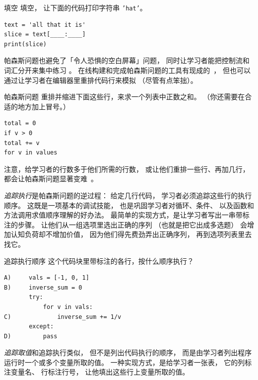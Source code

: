 \begin{aside}{填空}
  填空，
  让下面的代码打印字符串 \texttt{'hat'}。

\begin{verbatim}
text = 'all that it is'
slice = text[____:____]
print(slice)
\end{verbatim}
\end{aside}

帕森斯问题也避免了「令人恐惧的空白屏幕」问题，
同时让学习者能把控制流和词汇分开来集中练习
\cite{Pars2006,Eric2015,Morr2016,Eric2017}。
在线构建和完成帕森斯问题的工具有现成的~\cite{Ihan2011}，
但也可以通过让学习者在编辑器里重排代码行来模拟
（尽管有点笨拙）。

\begin{aside}{帕森斯问题}
  重排并缩进下面这些行，来求一个列表中正数之和。
  （你还需要在合适的地方加上冒号。）

\begin{verbatim}
total = 0
if v > 0
total += v
for v in values
\end{verbatim}
\end{aside}

注意，给学习者的行数多于他们所需的行数，
或让他们重排一些行、再加几行，
都会让帕森斯问题显著变难~\cite{Harm2016}。


\emph{追踪执行}是帕森斯问题的逆过程：
给定几行代码，
学习者必须追踪这些行的执行顺序。
这既是一项基本的调试技能，
也是巩固学习者对循环、条件、
以及函数和方法调用求值顺序理解的好办法。
最简单的实现方式，是让学习者写出一串带标注的步骤。
让他们从一组选项里选出正确的序列
（也就是把它出成多选题）
会增加认知负荷却不增加价值，
因为他们得先费劲弄出正确序列，
再到选项列表里去找它。

\begin{aside}{追踪执行顺序}
  这个代码块里带标注的各行，按什么顺序执行？

\begin{verbatim}
A)     vals = [-1, 0, 1]
B)     inverse_sum = 0
       try:
           for v in vals:
C)             inverse_sum += 1/v
       except:
D)         pass
\end{verbatim}
\end{aside}

\emph{追踪取值}和追踪执行类似，
但不是列出代码执行的顺序，
而是由学习者列出程序运行时一个或多个变量所取的值。
一种实现方式，是给学习者一张表，
它的列标注变量名、
行标注行号，
让他填出这些行上变量所取的值。

